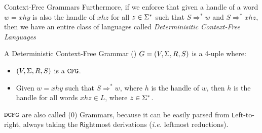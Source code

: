 \begin{section}{Context-Free Grammars}
Furthermore, if we enforce that given a handle of a word $w = xhy$
is also the handle of $xhz $ for all $z \in \Sigma^*$ such that $S \Rightarrow^* w$ and
$S \Rightarrow^* xhz$, then we have an entire
class of languages called \textit{Determinisitic Context-Free Languages}

\begin{definition}
A Deterministic Context-Free Grammar () $G = (V, \Sigma, R, S)$ is a 4-uple where:
	\begin{itemize}
		\item $(V, \Sigma, R, S)$ is a $\texttt{CFG}$.
		\item Given $w = xhy$ such that $S \Rightarrow^* w$, where $h$ is the handle
		of $w$, then $h$ is the handle for all words $xhz \in L$, where $z \in \Sigma^*$.
	\end{itemize}
\end{definition}

$\texttt{DCFG}$ are also called (0) Grammars, because it can
be easily parsed from \texttt{L}eft-to-right, always taking the \texttt{R}ightmost
derivations (\textit{i.e.} leftmost reductions).

\end{section}
